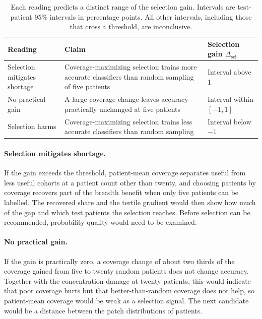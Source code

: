 \documentclass[11pt]{article}
\begin{document}
\begin{table}[htbp]
\centering
\renewcommand{\arraystretch}{1.15}
\begin{tabularx}{\textwidth}{@{}lYY@{}}
\toprule
Reading & Claim & Selection gain $\Delta_{\mathrm{sel}}$ \\
\midrule
Selection mitigates shortage & Coverage-maximizing selection trains more accurate classifiers than random sampling of five patients & Interval above 1 \\
\addlinespace
No practical gain & A large coverage change leaves accuracy practically unchanged at five patients & Interval within $[-1,1]$ \\
\addlinespace
Selection harms & Coverage-maximizing selection trains less accurate classifiers than random sampling & Interval below $-1$ \\
\bottomrule
\end{tabularx}
\caption{Each reading predicts a distinct range of the selection gain. Intervals are test-patient 95\% intervals in percentage points. All other intervals, including those that cross a threshold, are inconclusive.}
\label{tab:readings}
\end{table}

\paragraph{Selection mitigates shortage.}
If the gain exceeds the threshold, patient-mean coverage separates useful from less useful cohorts at a patient count other than twenty, and choosing patients by coverage recovers part of the breadth benefit when only five patients can be labelled. The recovered share and the tertile gradient would then show how much of the gap and which test patients the selection reaches. Before selection can be recommended, probability quality would need to be examined.

\paragraph{No practical gain.}
If the gain is practically zero, a coverage change of about two thirds of the coverage gained from five to twenty random patients does not change accuracy. Together with the concentration damage at twenty patients, this would indicate that poor coverage hurts but that better-than-random coverage does not help, so patient-mean coverage would be weak as a selection signal. The next candidate would be a distance between the patch distributions of patients.
\end{document}
